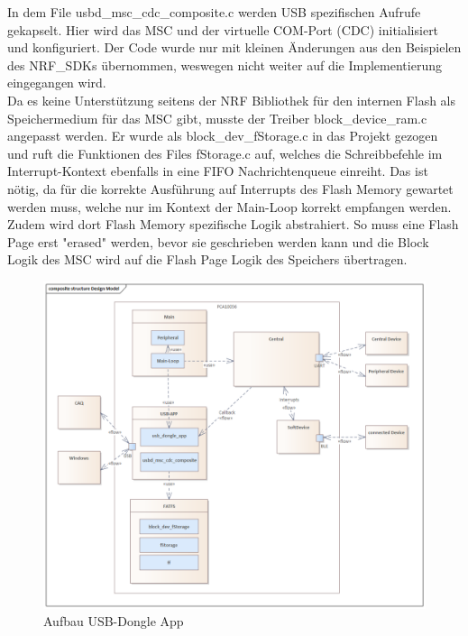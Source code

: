 In dem File usbd\_msc\_cdc\_composite.c werden \ac{USB} spezifischen Aufrufe gekapselt. Hier wird das \ac{MSC} und der virtuelle COM-Port (CDC) initialisiert und konfiguriert. Der Code wurde nur mit kleinen Änderungen aus den Beispielen des NRF\_SDKs übernommen, weswegen nicht weiter auf die Implementierung eingegangen wird.\\
Da es keine Unterstützung seitens der NRF Bibliothek für den internen Flash als Speichermedium für das \ac{MSC} gibt, musste der Treiber block\_device\_ram.c angepasst werden. Er wurde als block\_dev\_fStorage.c in das Projekt gezogen und ruft die Funktionen des Files fStorage.c auf, welches die Schreibbefehle im Interrupt-Kontext ebenfalls in eine \ac{FIFO} Nachrichtenqueue einreiht. Das ist nötig, da für die korrekte Ausführung auf Interrupts des Flash Memory gewartet werden muss, welche nur im Kontext der Main-Loop korrekt empfangen werden. Zudem wird dort Flash Memory spezifische Logik abstrahiert. So muss eine Flash Page erst "erased" werden, bevor sie geschrieben werden kann und die Block Logik des \ac{MSC} wird auf die Flash Page Logik des Speichers übertragen.

\begin{figure}[H] 
	\centering
	\includegraphics[width=\textwidth]{figures/Design_Model.png}
	\caption{Aufbau \ac{USB}-Dongle App}
\end{figure}


